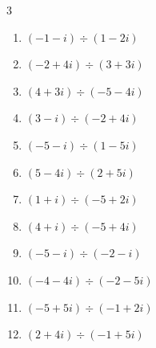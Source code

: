 \begin{multicols}{3}
\begin{enumerate}
  \item $\displaystyle (-1-i)\div(1-2i)$


  \item $\displaystyle (-2+4i)\div(3+3i)$


  \item $\displaystyle (4+3i)\div(-5-4i)$


  \item $\displaystyle (3-i)\div(-2+4i)$


  \item $\displaystyle (-5-i)\div(1-5i)$

        \phantom{$\displaystyle =-i$}

  \item $\displaystyle (5-4i)\div(2+5i)$


  \item $\displaystyle (1+i)\div(-5+2i)$


  \item $\displaystyle (4+i)\div(-5+4i)$


  \item $\displaystyle (-5-i)\div(-2-i)$


\columnbreak %

  \item $\displaystyle (-4-4i)\div(-2-5i)$


  \item $\displaystyle (-5+5i)\div(-1+2i)$

        \phantom{$\displaystyle =3+i$}

  \item $\displaystyle (2+4i)\div(-1+5i)$


\end{enumerate}
\end{multicols}
